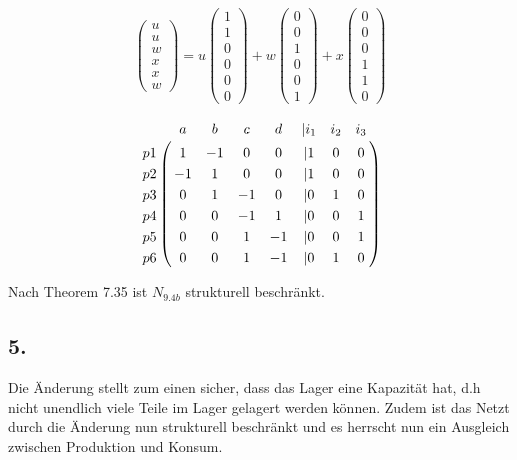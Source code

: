 \documentclass[a4paper,12pt]{scrartcl}
\begin{document}
\begin{align}
\left(
   \begin{array}{c}
   u \\
   u \\
   w \\
   x \\
   x \\
   w 
   \end{array}
\right)
=
u
\left(
   \begin{array}{c}
   1 \\
   1 \\
   0 \\
   0 \\
   0 \\
   0
   \end{array}
\right)
+
w
\left(
   \begin{array}{c}
   0 \\
   0 \\
   1 \\
   0 \\
   0 \\
   1
   \end{array}
\right)
+
x
\left(
   \begin{array}{c}
   0 \\
   0 \\
   0 \\
   1 \\
   1 \\
   0
   \end{array}
\right)
\end{align}

\begin{align}
\bordermatrix{
   &  a	&  b &  c &  d & | i_1 & i_2 & i_3 \cr
p1 &  1 & -1 &  0 &  0 &   | 1 &   0 &   0 \cr
p2 & -1 &  1 &  0 &  0 &   | 1 &   0 &   0 \cr
p3 &  0 &  1 & -1 &  0 &   | 0 &   1 &   0 \cr
p4 &  0 &  0 & -1 &  1 &   | 0 &   0 &   1 \cr
p5 &  0 &  0 &  1 & -1 &   | 0 &   0 &   1 \cr
p6 &  0 &  0 &  1 & -1 &   | 0 &   1 &   0 \cr}
\end{align}

Nach Theorem 7.35 ist $N_{9.4b}$ strukturell beschränkt.

\subsection{5.}
Die Änderung stellt zum einen sicher, dass das Lager eine Kapazität hat, d.h nicht unendlich viele Teile im Lager gelagert werden können. Zudem ist das Netzt durch die Änderung nun strukturell beschränkt und es herrscht nun ein Ausgleich zwischen Produktion und Konsum.
\end{document}
